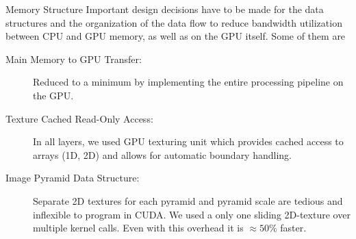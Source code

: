 \documentclass[final]{beamer}
\begin{document}
\begin{frame}{}
\begin{columns}[t]
      \begin{column}{.48\linewidth}
        \begin{block}{Memory Structure}
          Important design decisions have to be made for the data structures and
the organization of the data flow to reduce bandwidth utilization
between CPU and GPU memory, as well as on the GPU itself. Some of them are
\begin{description}
\item[ Main Memory to GPU Transfer: ] 
Reduced to a minimum by implementing the entire processing pipeline on the GPU.\\
\item[ Texture Cached Read-Only Access:]
In all layers, we used GPU texturing unit which provides cached access to arrays (1D, 2D) and allows for automatic boundary handling.
\item [ Image Pyramid Data Structure:]
Separate 2D textures for each pyramid and pyramid scale are tedious and inflexible to program in CUDA.
We used a only one sliding 2D-texture over multiple kernel calls. Even with this overhead it is $\approx 50\%$ faster.
\end{description}
        \end{block}




\end{column}
\end{columns}
\end{frame}
\end{document}
